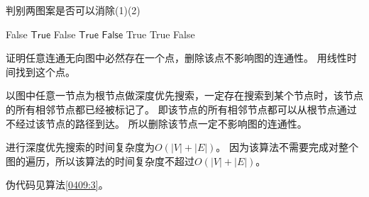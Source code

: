 \documentclass[answers]{exam}
\begin{document}
\begin{questions}
    \begin{algorithm}
        \caption{判别两图案是否可以消除(1)(2)} \label{0409:2:12}
        \begin{algorithmic}[1]
             
            \State \Return \textsf{False}
            \EndIf
            \EndFor
            \State \Return $\mathsf{True}$
             
            \State \Return \textsf{False}
            \EndIf
            \EndFor
            \State \Return $\mathsf{True}$
            \Else {}
            \State \Return $\mathsf{False}$
            \EndIf
            \EndProcedure
            \Statex
            \State \Return \textsf{True}
            \State \Return \textsf{True}
            \EndIf
            \State \Return \textsf{False}
            \EndProcedure
        \end{algorithmic}
    \end{algorithm}

    \question 证明任意连通无向图中必然存在一个点，删除该点不影响图的连通性。
    用线性时间找到这个点。

    \begin{solution}
        以图中任意一节点为根节点做深度优先搜索，一定存在搜索到某个节点时，该节点的所有相邻节点都已经被标记了。
        即该节点的所有相邻节点都可以从根节点通过不经过该节点的路径到达。
        所以删除该节点一定不影响图的连通性。

        进行深度优先搜索的时间复杂度为$O(|V|+|E|)$。
        因为该算法不需要完成对整个图的遍历，所以该算法的时间复杂度不超过$O(|V|+|E|)$。

        伪代码见算法\ref{0409:3}。
    \end{solution}


\end{questions}
\end{document}
